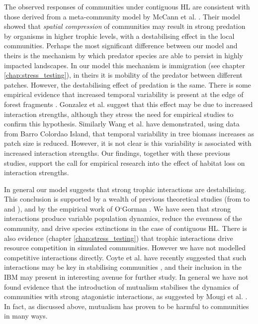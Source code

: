 The observed responses of communities under contiguous HL are consistent with those derived from a meta-community model by McCann et al. \cite{mccann2005dynamics}. Their model showed that \emph{spatial compression} of communities may result in strong predation by organisms in higher trophic levels, with a destabilising effect in the local communities. Perhaps the most significant difference between our model and theirs is the mechanism by which predator species are able to persist in highly impacted landscapes. In our model this mechanism is immigration (see chapter \ref{chap:stress_testing}), in theirs it is mobility of the predator between different patches. However, the destabilising effect of predation is the same. There is some empirical evidence that increased temporal variability is present at the edge of forest fragments \cite{ewers2006continuous}. Gonzalez et al. \cite{gonzalez2011disentangled} suggest that this effect may be due to increased interaction strengths, although they stress the need for empirical studies to confirm this hypothesis. Similarly Wang et al. \cite{wang2014ecosystem} have demonstrated, using data from Barro Colordao Island, that temporal variability in tree biomass increases as patch size is reduced. However, it is not clear is this variability is associated with increased interaction strengths. Our findings, together with these previous studies, support the call for empirical research into the effect of habitat loss on interaction strengths.

In general our model suggests that strong trophic interactions are destabilising. This conclusion is supported by a wealth of previous theoretical studies (from \cite{may1972will} to \cite{mccann1998weak} and \cite{neutel2002stability}), and by the empirical work of O`Gorman \cite{o2009perturbations}. We have seen that strong interactions produce variable population dynamics, reduce the evenness of the community, and drive species extinctions in the case of contiguous HL. There is also evidence (chapter \ref{chap:stress_testing}) that trophic interactions drive resource competition in simulated communities. However we have not modelled competitive interactions directly. Coyte et al. have recently suggested that such interactions may be key in stabilising communities \cite{coyte2015ecology}, and their inclusion in the IBM may present in interesting avenue for further study. In general we have not found evidence that the introduction of mutualism stabilises the dynamics of communities with strong atagonistic interactions, as suggested by Mougi et al. \cite{mougi2012diversity}. In fact, as discussed above, mutualism has proven to be harmful to communities in many ways.


